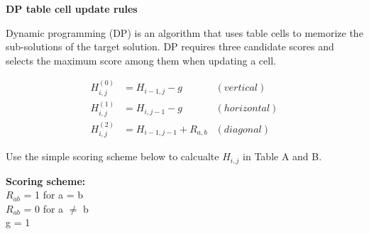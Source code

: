 \question \textbf{DP table cell update rules}
  
Dynamic programming (DP) is an algorithm that uses table cells to memorize the sub-solutions of the target solution. DP requires three candidate scores and selects the maximum score among them when updating a cell.

\begin{align*}
H_{i,j}^{(0)} &= H_{i-1,j} - g &(vertical) \\
H_{i,j}^{(1)} &= H_{i,j-1} - g	&(horizontal) \\
H_{i,j}^{(2)} &= H_{i-1,j-1} + R_{a,b} &(diagonal)
\end{align*}

Use the simple scoring scheme below to calcualte $H_{i,j}$ in Table A and B. 

\textbf{Scoring scheme: }\\
\null \quad $R_{ab}$ = 1 for a = b \\ 
\null \quad $R_{ab}$ = 0 for a $\neq$ b \\ 
\null \quad g = 1  

\vspace{0.1 in}


\pagebreak
